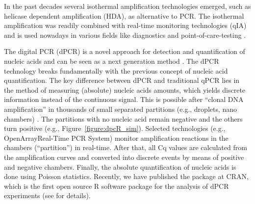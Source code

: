 In the past decades several isothermal amplification technologies
emerged, such as helicase 
dependent amplification (HDA), as alternative to PCR. The isothermal 
amplification 
was readily combined with real-time monitoring technologies (qIA) and is used 
nowadays in various fields like diagnostics and point-of-care-testing 
\citep{rodiger_nucleic_2014}.

The digital PCR (dPCR) is a novel approach for detection and quantification of 
nucleic acids and can be seen as a next generation method 
\citep{huggett_qpcr_2015}. The dPCR technology 
breaks fundamentally with the previous concept of nucleic acid quantification. 
The key difference between dPCR and traditional qPCR lies in the method of 
measuring (absolute) nucleic acids amounts, which yields discrete information 
instead of the continuous signal. This is possible after ``clonal DNA 
amplification'' in thousands of small separated partitions (e.g., droplets, 
nano 
chambers) \citep{huggett_2013, milbury_2014, morley_2014}. The partitions with 
no 
nucleic acid remain negative and the others turn positive (e.g., 
Figure~\ref{figure:dpcR_sim}). Selected technologies (e.g., 
OpenArray\textregistered Real-Time PCR System) monitor amplification reactions 
in the chambers (``partition'') in real-time. After that, all Cq values are 
calculated from the amplification curves and converted into discrete events by 
means of positive and negative chambers. Finally, the absolute quantification 
of 
nucleic acids is done using Poisson statistics. Recently, we have published the 
 package at CRAN, which is the first 
open source R software package for the analysis of dPCR 
experiments (see  for details).

